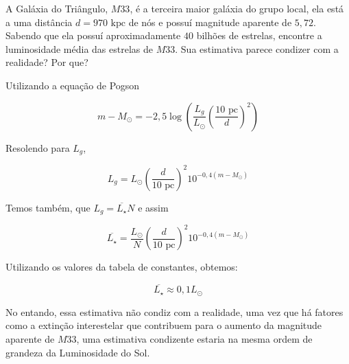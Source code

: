 \documentclass[11pt]{article}
\begin{document}
\begin{pproblem} A Galáxia do Triângulo, \(M33\), é a terceira maior galáxia do grupo local, ela está a uma distância \(d=970 \text{ kpc}\) de nós e possuí magnitude aparente de \(5,72\). Sabendo que ela possuí aproximadamente \(40\) bilhões de estrelas, encontre a luminosidade média das estrelas de \(M33\). Sua estimativa parece condizer com a realidade? Por que?
\begin{pssolution*}{}{}
    Utilizando a equação de Pogson

    \[m-M_\odot = -2,5\log \left(\frac{L_{g}}{L_\odot}\left(\frac{10 \text{ pc}}{d}\right)^2\right)\]

    Resolendo para \(L_g\), 

    \[L_g = L_\odot \left(\frac{d}{10\text{ pc}}\right)^2 10^{-0,4(m-M_\odot)}\]

    Temos também, que \(L_g = \overline{L_\star} N\) e assim

    \[\overline{L_\star} = \frac{L_\odot}{N} \left(\frac{d}{10\text{ pc}}\right)^2 10^{-0,4(m-M_\odot)}\]

    Utilizando os valores da tabela de constantes, obtemos:

    \[\overline{L_\star} \approx 0,1L_\odot\]

    No entando, essa estimativa não condiz com a realidade, uma vez que há fatores como a extinção interestelar que contribuem para o aumento da magnitude aparente de \(M33\), uma estimativa condizente estaria na mesma ordem de grandeza da Luminosidade do Sol.

\end{pssolution*}
\end{pproblem}
\end{document}
